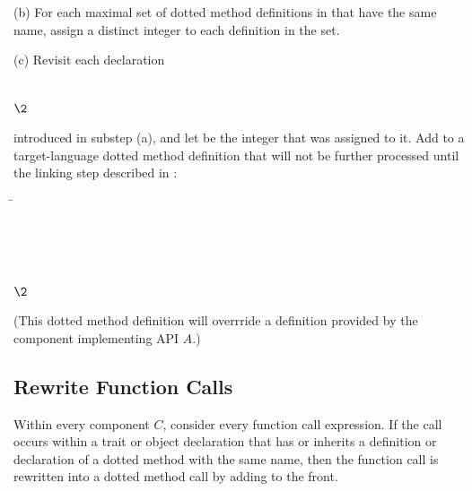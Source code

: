 (b) For each maximal set of
dotted method definitions in  that have the same name, assign a
distinct integer to each definition in the set.

(c) Revisit each declaration
\begin{codeexamplesize}
\begin{tabbing}
 \\
\(\2\)
\end{tabbing}
\end{codeexamplesize}
introduced in substep (a), and let  be the integer that was assigned to it.
Add to  a target-language dotted method definition that will not be further processed
until the linking step described in :
\begin{codeexamplesize}
\begin{tabbing}
\= \\
\>                   \\
\>                   \\
\>                  \EXP{\ldots,} \\
\>                   \\
\(\2\)
\end{tabbing}
\end{codeexamplesize}
(This dotted method definition will overrride a definition provided
by the component implementing API $A$.)


\subsection{Rewrite Function Calls}

Within every component $C$, consider every function call expression.
If the call occurs within a trait
or object declaration that has or inherits a definition or declaration
of a dotted method with the same name, then the function call
is rewritten into a dotted method call by adding  to the front.

